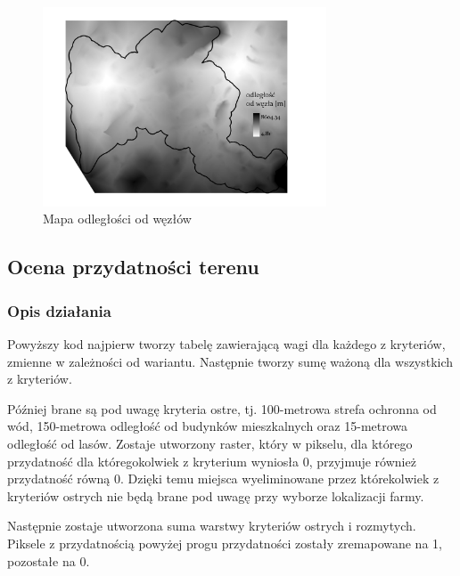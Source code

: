 \documentclass{article}
\begin{document}
\begin{figure}[H]
    \centering
    \includegraphics[width=0.75\textwidth]{img/kryterium7-wezly.jpg}
    \caption*{Mapa odległości od węzłów}
\end{figure}

\subsection{Ocena przydatności terenu}
\subsubsection{Opis działania}
Powyższy kod najpierw tworzy tabelę zawierającą wagi dla każdego z kryteriów, zmienne w zależności od wariantu. Następnie tworzy sumę ważoną dla wszystkich z kryteriów.

Później brane są pod uwagę kryteria ostre, tj. 100-metrowa strefa ochronna od wód, 150-metrowa odległość od budynków mieszkalnych oraz 15-metrowa odległość od lasów. Zostaje utworzony raster, który w pikselu, dla którego przydatność dla któregokolwiek z kryterium wyniosła 0, przyjmuje również przydatność równą 0. Dzięki temu miejsca wyeliminowane przez którekolwiek z kryteriów ostrych nie będą brane pod uwagę przy wyborze lokalizacji farmy. 

Następnie zostaje utworzona suma warstwy kryteriów ostrych i rozmytych. Piksele z przydatnością powyżej progu przydatności zostały zremapowane na 1, pozostałe na 0.
\end{document}
